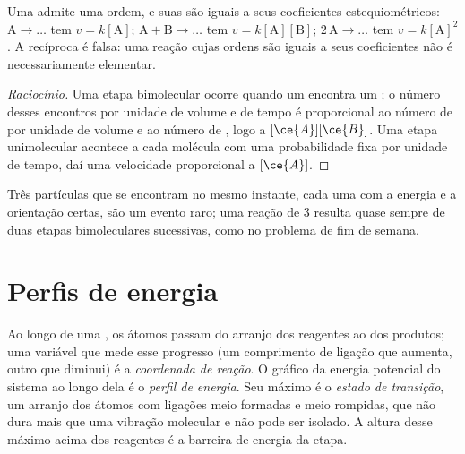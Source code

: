 \begin{proposition}\label{prop:b1:elementary-steps:elementary-law}
Uma  admite uma ordem, e suas  são iguais
a seus coeficientes estequiométricos: $\mathrm{A} \to \dots$ tem $v = k[\mathrm{A}]$;
$\mathrm{A} + \mathrm{B} \to \dots$ tem $v = k[\mathrm{A}][\mathrm{B}]$;
$2\,\mathrm{A} \to \dots$ tem $v = k[\mathrm{A}]^2$. A recíproca é falsa:
uma reação cujas ordens são iguais a seus coeficientes não é
necessariamente elementar.
\end{proposition}

\begin{proof}[Raciocínio]
Uma etapa bimolecular ocorre quando um  encontra um ; o
número desses encontros por unidade de volume e de tempo é proporcional
ao número de  por unidade de volume e ao número de , logo a
$[\ce{A}][\ce{B}]$. Uma etapa unimolecular acontece a cada molécula com
uma probabilidade fixa por unidade de tempo, daí uma velocidade
proporcional a $[\ce{A}]$.
\end{proof}

\begin{remark}\label{rem:b1:elementary-steps:termolecular}
Três partículas que se encontram no mesmo instante, cada uma com a
energia e a orientação certas, são um evento raro; uma reação de  3 resulta quase sempre de duas etapas bimoleculares sucessivas,
como no problema de fim de semana.
\end{remark}

\section{Perfis de energia}

\begin{definition}\label{def:b1:elementary-steps:energy-profile}
Ao longo de uma , os átomos passam do arranjo dos
reagentes ao dos produtos; uma variável que mede esse progresso (um
comprimento de ligação que aumenta, outro que diminui) é a
\emph{coordenada de reação}. O gráfico da energia
potencial do sistema ao longo dela é o \emph{perfil de
energia}. Seu máximo é o \emph{estado de
transição}, um arranjo dos átomos com ligações meio
formadas e meio rompidas, que não dura mais que uma vibração molecular e
não pode ser isolado. A altura desse máximo acima dos reagentes é a
barreira de energia da etapa.
\end{definition}

